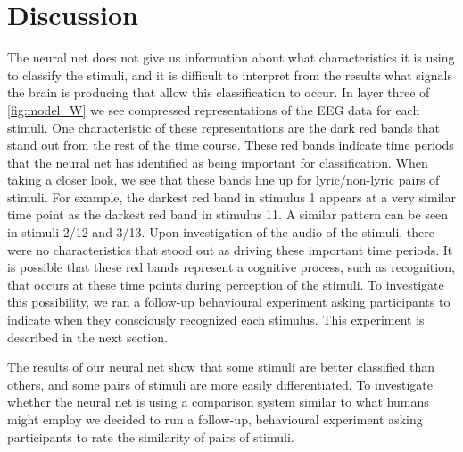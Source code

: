 \section{Discussion}
The neural net does not give us information about what characteristics it is using to classify the stimuli, and it is difficult to interpret from the results what signals the brain is producing that allow this classification to occur. 
In layer three of \autoref{fig:model_W} we see compressed representations of the EEG data for each stimuli. 
One characteristic of these representations are the dark red bands that stand out from the rest of the time course. 
These red bands indicate time periods that the neural net has identified as being important for classification. 
When taking a closer look, we see that these bands line up for lyric/non-lyric pairs of stimuli. 
For example, the darkest red band in stimulus 1 appears at a very similar time point as the darkest red band in stimulus 11.
A similar pattern can be seen in stimuli 2/12 and 3/13.
Upon investigation of the audio of the stimuli, there were no characteristics that stood out as driving these important time periods.
It is possible that these red bands represent a cognitive process, such as recognition, that occurs at these time points during perception of the stimuli. 
To investigate this possibility, we ran a follow-up behavioural experiment asking participants to indicate when they consciously recognized each stimulus. 
This experiment is described in the next section.

The results of our neural net show that some stimuli are better classified than others, and some pairs of stimuli are more easily differentiated. 
To investigate whether the neural net is using a comparison system similar to what humans might employ we decided to run a follow-up, behavioural experiment asking participants to rate the similarity of pairs of stimuli. 

